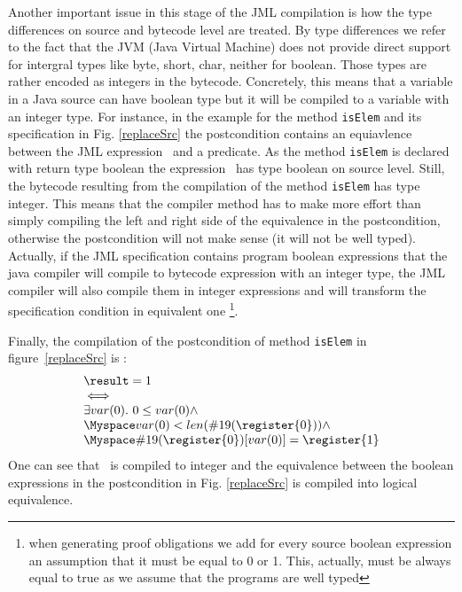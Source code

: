 \begin{enumerate}
Another important issue in this stage of the JML compilation is how the type differences on source and bytecode level are treated. 
By type differences we refer to the fact that the JVM (Java Virtual Machine) does not provide direct support for intergral types like byte, short, char, neither for boolean. Those types are rather encoded as integers in the bytecode. Concretely, this means that a variable in a Java source can have boolean type but it will be compiled to a variable with
an integer type.%
For instance, in the example for the method 
\texttt{isElem} and its specification in Fig. \ref{replaceSrc}  the postcondition contains an equiavlence between the JML expression  
\result \ and a predicate. As the method \texttt{isElem} is declared with return type boolean the expression \result \ has type boolean on source level. 
Still, the bytecode resulting from the compilation of the method  \texttt{isElem} has type integer. This means that the compiler method has to make
 more effort than simply compiling the left and right side of the equivalence in the postcondition, otherwise the postcondition will not make sense
 (it will not be well typed). Actually, 
if the JML specification contains program boolean expressions that the java compiler will compile to bytecode expression with an integer type, the JML compiler 
will also compile them in integer expressions and will transform the specification condition in equivalent one 
\footnote{when generating proof obligations we add for every source boolean expression an assumption that it must be equal to 0 or 1. This, actually, must be always
equal to true as we assume that the programs are well typed}.  

Finally, the compilation of the postcondition of method \texttt{isElem} in figure~\ref{replaceSrc} is :
 $$\begin{array}{l}
         \result = 1 \\
         \iff \\ 
         \exists  var(0) . \ 0 \leq var(0) \wedge \\
         \Myspace var(0) < len(\#19(\register{0})) \wedge\\
         \Myspace  \#19(\register{0})[var(0)] = \register{1}  
   \end{array}
$$
One can see that \result \ is compiled to integer and the equivalence between the boolean expressions in the postcondition in Fig. \ref{replaceSrc}  is compiled into logical equivalence.


\end{enumerate}
